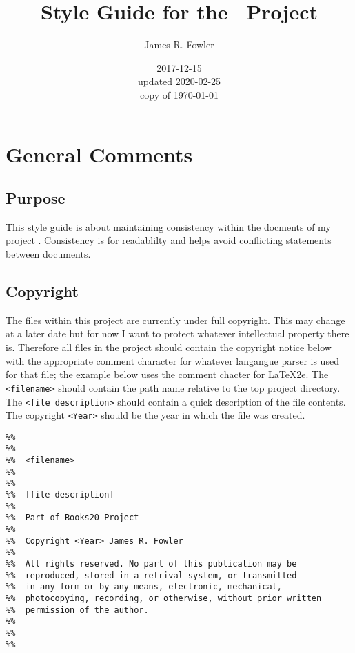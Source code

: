 \documentclass[twoside]{book}
\begin{document}
\frontmatter

\title{Style Guide for the \ProjectTitle\ Project}
\author{James R. Fowler}
\date{2017-12-15\\ updated 2020-02-25\\ copy of \today}

\maketitle

\tableofcontents

\mainmatter

\chapter{General Comments}

\section{Purpose}
This style guide is about maintaining consistency within the docments
of my project \ProjectTitle. Consistency is for readablilty and
helps avoid conflicting statements between documents. 

\section{Copyright}

The files within this project are currently under full copyright.  This
may change at a later date but for now I want to protect whatever
intellectual property there is.  Therefore all files in the project
should contain the copyright notice below with the appropriate comment
character for whatever langangue parser is used for that file; the
example below uses the comment chacter for \LaTeX2e.  The
\texttt{<filename>} should contain the path name relative to the top
project directory. The \texttt{<file description>} should contain a
quick description of the file contents. The copyright \texttt{<Year>}
should be the year in which the file was created.

\begin{verbatim}
%%
%%
%%  <filename>
%%
%%  
%%  [file description]
%%
%%  Part of Books20 Project
%%
%%  Copyright <Year> James R. Fowler
%%
%%  All rights reserved. No part of this publication may be
%%  reproduced, stored in a retrival system, or transmitted
%%  in any form or by any means, electronic, mechanical,
%%  photocopying, recording, or otherwise, without prior written
%%  permission of the author.
%%
%%
%%
\end{verbatim}
\end{document}
